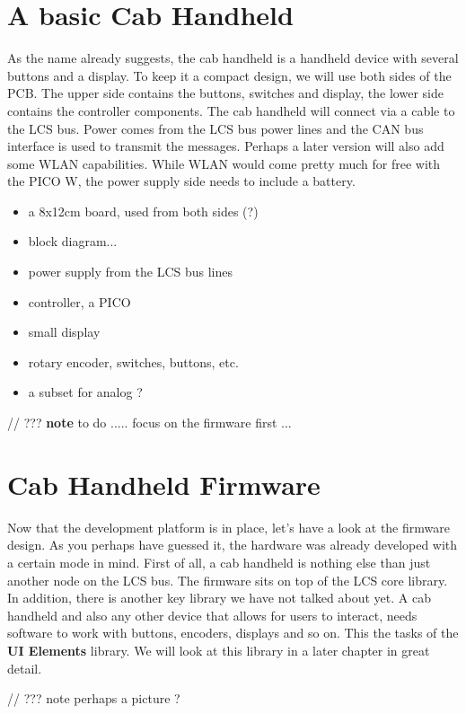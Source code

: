 \section{A basic Cab Handheld}

As the name already suggests, the cab handheld is a handheld device with several buttons and a display. To keep it a compact design, we will use both sides of the PCB. The upper side contains the buttons, switches and display, the lower side contains the controller components. The cab handheld will connect via a cable to the LCS bus. Power comes from the LCS bus power lines and the CAN bus interface is used to transmit the messages. Perhaps a later version will also add some WLAN capabilities. While WLAN would come pretty much for free with the PICO W, the power supply side needs to include a battery.

\begin{itemize}
\item a 8x12cm board, used from both sides (?)
\item block diagram...
\item power supply from the LCS bus lines
\item controller, a PICO
\item small display
\item rotary encoder, switches, buttons, etc.
\item a subset for analog ?
\end{itemize}

// ??? \textbf{note} to do ..... focus on the firmware first ...

\section{Cab Handheld Firmware}

Now that the development platform is in place, let's have a look at the firmware design. As you perhaps have guessed it, the hardware was already developed with a certain mode in mind. First of all, a cab handheld is nothing else than just another node on the LCS bus. The firmware sits on top of the LCS core library. In addition, there is another key library we have not talked about yet. A cab handheld and also any other device that allows for users to interact, needs software to work with buttons, encoders, displays and so on. This the tasks of the \textbf{UI Elements } library. We will look at this library in a later chapter in great detail.

// ??? note perhaps a picture ?

